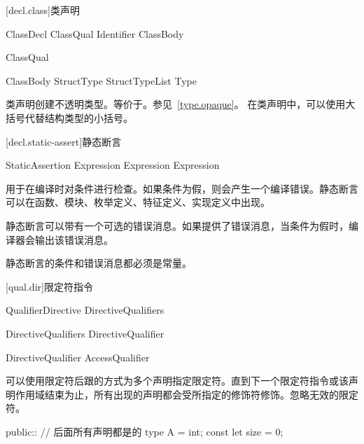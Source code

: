 [decl.class]{类声明}

\begin{bnf}{ClassDecl}
    ClassQual\bnfs {} Identifier ClassBody
\end{bnf}

\begin{bnf}{ClassQual}
\end{bnf}

\begin{bnf}{ClassBody}
    StructType \br
    \terminal{\{} \terminal{\}} \br
    \terminal{\{} StructTypeList \terminal{,}\bnfq \terminal{\}} \br
    \terminal{=} Type
\end{bnf}

\pnum
类声明创建不透明类型。等价于。参见~\ref{type.opaque}。
在类声明中，可以使用大括号代替结构类型的小括号。

[decl.static-assert]{静态断言}

\begin{bnf}{StaticAssertion}
      Expression \terminal{;} \br
      Expression \terminal{:} Expression \terminal{;}
\end{bnf}

\pnum
{}用于在编译时对条件进行检查。如果条件为假，则会产生一个编译错误。静态断言可以在函数、模块、枚举定义、特征定义、实现定义中出现。

\pnum
静态断言可以带有一个可选的错误消息。如果提供了错误消息，当条件为假时，编译器会输出该错误消息。

\pnum
静态断言的条件和错误消息都必须是常量。

[qual.dir]{限定符指令}

\begin{bnf}{QualifierDirective}
    DirectiveQualifiers \terminal{::}
\end{bnf}

\begin{bnf}{DirectiveQualifiers}
    DirectiveQualifier\bnfp
\end{bnf}

\begin{bnf}{DirectiveQualifier}
    AccessQualifier
\end{bnf}

\pnum
可以使用限定符后跟\tcode{::}的方式为多个声明指定限定符。直到下一个限定符指令或该声明作用域结束为止，所有出现的声明都会受所指定的修饰符修饰。忽略无效的限定符。

\enterexample
\begin{codeblock}
public:: // 后面所有声明都是的
type A = int;
const let size = 0;
\end{codeblock}